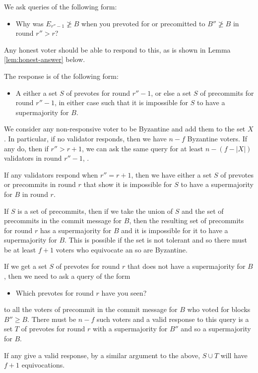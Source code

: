\documentclass{article}
\begin{document}
We ask queries of the following form: 
\begin{itemize}
\item Why was $E_{r''-1} \not\geq B$  when you prevoted for or precomitted to $B'' \not\geq B$ in round $r'' > r$?
\end{itemize}
\noindent Any honest voter should be able to respond to this, as is shown in Lemma \ref{lem:honest-answer} below. 

The response is of the following form:
\begin{itemize}
\item A either a set $S$ of prevotes for round $r''-1$, or else a set $S$ of precommits for round $r''-1$, in either case such that it is impossible for $S$ to have a supermajority for $B$.
\end{itemize}

We consider any non-responsive voter to be Byzantine and add them to the set $X$.  In particular, if no validator responds, then we have $n-f$ Byzantine voters. If any do, then if $r'' > r+1$, we can ask the same query for at least $n-(f - |X|)$ validators in round $r''-1$, .

If any validators respond when $r''=r+1$, then we have either a set $S$ of prevotes or precommits in round $r$ that show it is impossible for $S$ to have a supermajority for $B$ in round $r$.

If $S$ is a set of precommits, then if we take the union of $S$ and the set of precommits in the commit message for $B$, then the resulting set of precommits for round $r$ has a supermajority for $B$ and it is impossible for it to have a supermajority for $B$. This is possible if the set is not tolerant and so there must be at least $f+1$ voters who equivocate an so are Byzantine.

If we get a set $S$ of prevotes for round $r$ that does not have a supermajority for $B$, then we need to ask a query of the form

\begin{itemize}
\item Which prevotes for round $r$ have you seen?
\end{itemize}
\noindent to all the voters of precommit in the commit message for $B$  who voted for blocks $B'' \geq B$. There must be $n-f$ such voters and a valid response to this query is a set $T$ of prevotes for round $r$ with a supermajority for $B''$ and so a supermajority for $B$.


If any give a valid response, by a similar argument to the above, $S \cup T$ will have $f+1$ equivocations.
\end{document}
